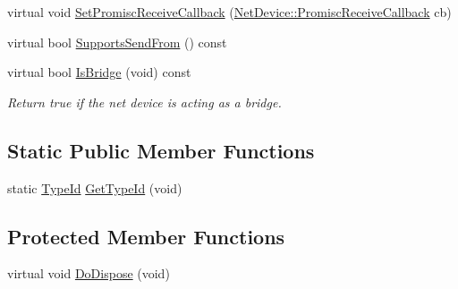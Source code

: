 \begin{DoxyCompactItemize}
\item 
virtual void \hyperlink{classns3_1_1VirtualNetDevice_a3b0544bacdb411a716515cda7e62c2f3}{Set\+Promisc\+Receive\+Callback} (\hyperlink{classns3_1_1NetDevice_a427225795919f26c414bee2ea3f31ed2}{Net\+Device\+::\+Promisc\+Receive\+Callback} cb)
\item 
virtual bool \hyperlink{classns3_1_1VirtualNetDevice_aa31fa2c5ff6423606d7b683dd4de467f}{Supports\+Send\+From} () const 
\item 
virtual bool \hyperlink{classns3_1_1VirtualNetDevice_ab7c75263f37d8933e572f228ebc418a3}{Is\+Bridge} (void) const 
\begin{DoxyCompactList}\small\item\em Return true if the net device is acting as a bridge. \end{DoxyCompactList}\end{DoxyCompactItemize}
\subsection*{Static Public Member Functions}
\begin{DoxyCompactItemize}
\item 
static \hyperlink{classns3_1_1TypeId}{Type\+Id} \hyperlink{classns3_1_1VirtualNetDevice_a7f923e2ff1ecd669740a5221b703dab1}{Get\+Type\+Id} (void)
\end{DoxyCompactItemize}
\subsection*{Protected Member Functions}
\begin{DoxyCompactItemize}
\item 
virtual void \hyperlink{classns3_1_1VirtualNetDevice_a7106b7623f5d58e783793de4f97bacfc}{Do\+Dispose} (void)
\end{DoxyCompactItemize}
